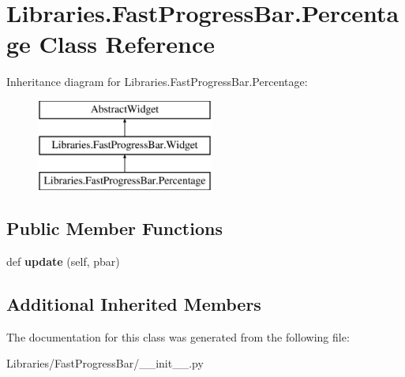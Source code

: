 \hypertarget{class_libraries_1_1_fast_progress_bar_1_1_percentage}{}\section{Libraries.\+Fast\+Progress\+Bar.\+Percentage Class Reference}
\label{class_libraries_1_1_fast_progress_bar_1_1_percentage}
Inheritance diagram for Libraries.\+Fast\+Progress\+Bar.\+Percentage\+:\begin{figure}[H]
\begin{center}
\leavevmode
\includegraphics[height=3.000000cm]{class_libraries_1_1_fast_progress_bar_1_1_percentage}
\end{center}
\end{figure}
\subsection*{Public Member Functions}
\begin{DoxyCompactItemize}
\item 
def {\bfseries update} (self, pbar)\hypertarget{class_libraries_1_1_fast_progress_bar_1_1_percentage_aa23d95e43316026fd23e1f6e12b96f9c}{}\label{class_libraries_1_1_fast_progress_bar_1_1_percentage_aa23d95e43316026fd23e1f6e12b96f9c}

\end{DoxyCompactItemize}
\subsection*{Additional Inherited Members}


The documentation for this class was generated from the following file\+:\begin{DoxyCompactItemize}
\item 
Libraries/\+Fast\+Progress\+Bar/\+\_\+\+\_\+init\+\_\+\+\_\+.\+py\end{DoxyCompactItemize}
